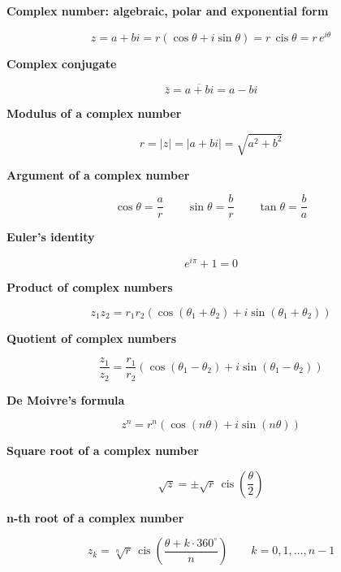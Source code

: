 \documentclass[11pt]{article}
\newcommand{\sub}[1]{\par\medskip\textbf{#1}\par}     %
\begin{document}
\sub{Complex number: algebraic, polar and exponential form}
\[ z = a + bi = r\left(\cos\theta + i\sin\theta\right) = r\,\operatorname{cis}\theta = r\,e^{i\theta} \]

\sub{Complex conjugate}
\[ \bar z = \overline{a + bi} = a - bi \]

\sub{Modulus of a complex number}
\[ r = |z| = |a + bi| = \sqrt{a^2 + b^2} \]

\sub{Argument of a complex number}
\[ \cos\theta = \frac{a}{r} \qquad \sin\theta = \frac{b}{r} \qquad \tan\theta = \frac{b}{a} \]

\sub{Euler's identity}
\[ e^{i\pi} + 1 = 0 \]

\sub{Product of complex numbers}
\[ z_1 z_2 = r_1 r_2 \left(\cos(\theta_1 + \theta_2) + i\sin(\theta_1 + \theta_2)\right) \]

\sub{Quotient of complex numbers}
\[ \frac{z_1}{z_2} = \frac{r_1}{r_2}\left(\cos(\theta_1 - \theta_2) + i\sin(\theta_1 - \theta_2)\right) \]

\sub{De Moivre's formula}
\[ z^n = r^n\left(\cos(n\theta) + i\sin(n\theta)\right) \]

\sub{Square root of a complex number}
\[ \sqrt{z} = \pm\sqrt{r}\,\operatorname{cis}\!\left(\frac{\theta}{2}\right) \]

\sub{n-th root of a complex number}
\[ z_k = \sqrt[n]{r}\,\operatorname{cis}\!\left(\frac{\theta + k\cdot 360^\circ}{n}\right) \qquad k = 0, 1, \dots, n-1 \]
\end{document}
